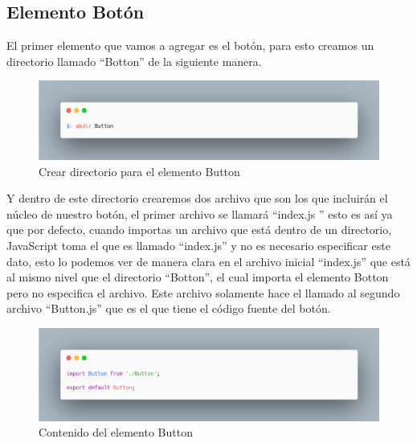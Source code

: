 \subsection{Elemento Botón}
El primer elemento que vamos a agregar es el botón, para esto creamos un directorio llamado “Botton” de la siguiente manera.
\newline
\newline
\begin{figure}[H]
    \includegraphics[width=1\textwidth]{./Imagenes/carbon-3.png}
    \caption[Crear directorio para el elemento Button]{Crear directorio para el elemento Button}
    \end{figure}
\newline
\newline
Y dentro de este directorio crearemos dos archivo que son los que incluirán el núcleo de nuestro botón, el primer archivo se llamará “index.js ” esto es así ya que por defecto, cuando importas un archivo que está dentro de un directorio, JavaScript toma el que es llamado “index.js” y no es necesario especificar este dato, esto lo podemos ver de manera clara en el archivo inicial “index.js” que está al mismo nivel que el directorio “Botton”, el cual importa el elemento Botton pero no especifica el archivo. Este archivo solamente hace el llamado al segundo archivo “Button.js” que es el que tiene el código fuente del botón. 
\newline
\newline
\begin{figure}[H]
    \includegraphics[width=1\textwidth]{./Imagenes/carbon-5.png}
    \caption[Contenido del elemento Button]{Contenido del elemento Button}
    \end{figure}
\newline
\newline
